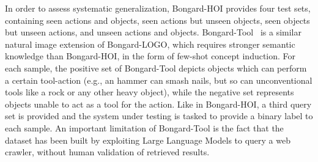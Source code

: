 In order to assess systematic generalization, Bongard-HOI provides four test sets, containing seen actions and objects, seen actions but unseen objects, seen objects but unseen actions, and unseen actions and objects.
Bongard-Tool~\cite{jiang2023bongard} is a similar natural image extension of Bongard-LOGO, which requires stronger semantic knowledge than Bongard-HOI, in the form of few-shot concept induction.
For each sample, the positive set of Bongard-Tool depicts objects which can perform a certain tool-action (e.g., an hammer can smash nails, but so can unconventional tools like a rock or any other heavy object), while the negative set represents objects unable to act as a tool for the action.
Like in Bongard-HOI, a third query set is provided and the system under testing is tasked to provide a binary label to each sample.
An important limitation of Bongard-Tool is the fact that the dataset has been built by exploiting Large Language Models to query a web crawler, without human validation of retrieved results.


